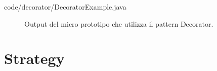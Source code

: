 \documentclass[12pt]{article}
\begin{document}

{code/decorator/DecoratorExample.java}

\begin{figure}[h!]
  \caption{\small Output del micro prototipo che utilizza il pattern Decorator.}
  \label{fig:client_decorator}
\end{figure}


\newpage
\section{Strategy}
\label{appendix:strategy}
\end{document}
